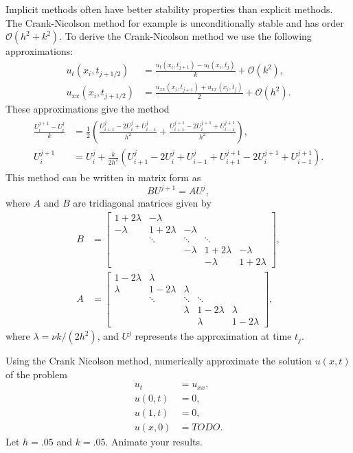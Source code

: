 Implicit methods often have better stability properties than explicit methods. The Crank-Nicolson method for example is unconditionally stable and has order $\mathcal{O}(h^2 + k^2)$. To derive the Crank-Nicolson method we use the following approximations: 
\begin{align*}
	u_t(x_i,t_{j+1/2}) &= \frac{u_t(x_i,t_{j+1}) - u_t(x_i,t_j)}{k} + \mathcal{O}(k^2), \\
	u_{xx}(x_i,t_{j+1/2}) &= \frac{u_{xx}(x_i,t_{j+1}) + u_{xx}(x_i,t_j)}{2} + \mathcal{O}(h^2).
\end{align*}
These approximations give the method 
\begin{align}
	\begin{split}
	\frac{U^{j+1}_i - U^j_i}{k} &= \frac{1}{2}\left( \frac{U^j_{i+1} - 2U^j_{i} + U^j_{i-1}}{h^2} + \frac{U^{j+1}_{i+1} - 2U^{j+1}_{i} + U^{j+1}_{i-1}}{h^2}  \right) ,\\
	U^{j+1}_i  &= U^j_i + \frac{k}{2h^2} \left( U^j_{i+1} - 2U^j_{i} + U^j_{i-1} + U^{j+1}_{i+1} - 2U^{j+1}_{i} + U^{j+1}_{i-1}   \right).
\end{split}
\end{align}
This method can be written in matrix form as 
\[
BU^{j+1} = A U^j ,
\]
where $A$ and $B$ are tridiagonal matrices given by 
\begin{align*}
B &= \left[\begin{array}{cccccc}1+2\lambda & -\lambda &  &  &  \\ -\lambda & 1+2\lambda &  -\lambda & &  \\ &  \ddots &   \ddots & \ddots \\ & &  -\lambda &  1+2\lambda & -\lambda \\ &  &  & -\lambda & 1+2\lambda\end{array}\right], \\
A &= \left[\begin{array}{cccccc}1-2\lambda & \lambda &  &  &  \\ \lambda & 1-2\lambda &  \lambda & &  \\ &  \ddots &   \ddots & \ddots \\ & &  \lambda &  1-2\lambda & \lambda \\ &  &  & \lambda & 1-2\lambda\end{array}\right], 
\end{align*}
where $\lambda = \nu k/(2h^2)$, 
and $U^j$ represents the approximation at time $t_j$.


\begin{problem}
	Using the Crank Nicolson method, numerically approximate the solution $u(x,t)$ of the problem 
	\begin{align*}
		u_t &= u_{xx},\\
		u(0,t) &= 0,\\
		u(1,t) &= 0,\\
		u(x,0) &= TODO.
	\end{align*}
	Let $h = .05$ and $k= .05$. 
	Animate your results. 
\end{problem}

